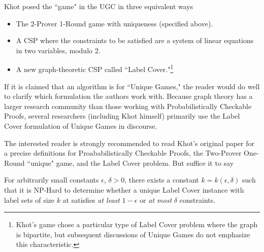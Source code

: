 Khot posed the ``game" in the UGC in three equivalent ways
\begin{itemize}
\item The 2-Prover 1-Round game with uniqueness (specified above).
\item A CSP where the constraints to be satisfied are a system of linear equations in two variables, modulo 2.
\item A new graph-theoretic CSP called ``Label Cover."\footnote{Khot's game chose a particular type of Label Cover problem where the graph is bipartite, but subsequent discussions of Unique Games do not emphasize this characteristic. }
\end{itemize}

If it is claimed that an algorithm is for ``Unique Games," the reader would do well to clarify which formulation the authors work with. Because graph theory has a larger research community than those working with Probabilistically Checkable Proofs, several researchers (including Khot himself) primarily use the Label Cover formulation of Unique Games in discourse. 

The interested reader is strongly recommended to read Khot's original paper for a precise definitions for Proababilistically Checkable Proofs, the Two-Prover One-Round ``unique" game, and the Label Cover problem. But suffice it to say

\begin{ugc}
For arbitrarily small constants $\epsilon$, $\delta > 0$, there exists a constant $k = k(\epsilon,\delta)$ such that it is NP-Hard to determine whether a unique Label Cover instance with label sets of size $k$ at satisfies \textit{at least} $1-\epsilon$ or \textit{at most} $\delta$ constraints.
\end{ugc}




%
